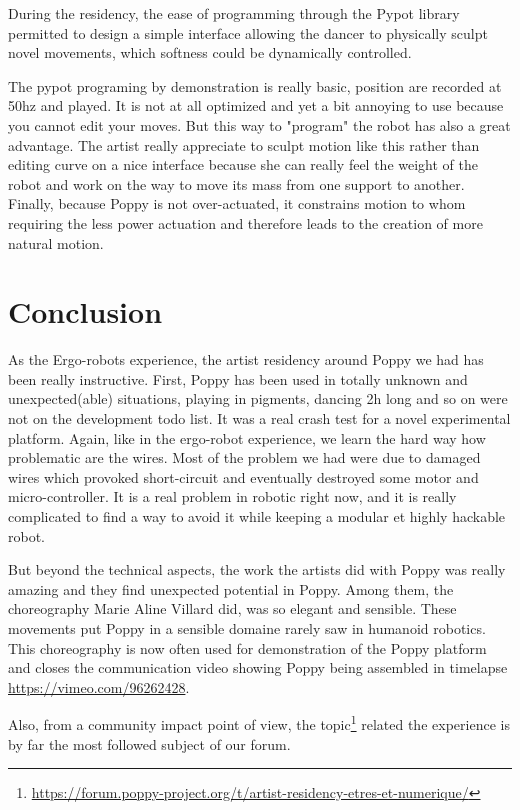 During the residency, the ease of programming through the Pypot library permitted to design a simple interface allowing the dancer to physically sculpt novel movements, which softness could be dynamically controlled.

The pypot programing by demonstration is really basic, position are recorded at 50hz and played. It is not at all optimized and yet a bit annoying to use because you cannot edit your moves. But this way to "program" the robot has also a great advantage. The artist really appreciate to sculpt motion like this rather than editing curve on a nice interface because she can really feel the weight of the robot and work on the way to move its mass from one support to another. Finally, because Poppy is not over-actuated, it constrains motion to whom requiring the less power actuation and therefore leads to the creation of more natural motion.


\section{Conclusion} %
As the Ergo-robots experience, the artist residency around Poppy we had has been really instructive. First, Poppy has been used in totally unknown and unexpected(able) situations, playing in pigments, dancing 2h long and so on were not on the development todo list. It was a real crash test for a novel experimental platform. Again, like in the ergo-robot experience, we learn the hard way how problematic are the wires. Most of the problem we had were due to damaged wires which provoked short-circuit and eventually destroyed some motor and micro-controller. It is a real problem in robotic right now, and it is really complicated to find a way to avoid it while keeping a modular et highly hackable robot.

But beyond the technical aspects, the work the artists did with Poppy was really amazing and they find unexpected potential in Poppy. Among them, the choreography Marie Aline Villard did, was so elegant and sensible. These movements put Poppy in a sensible domaine rarely saw in humanoid robotics. This choreography is now often used for demonstration of the Poppy platform and closes the communication video showing Poppy being assembled in timelapse \url{https://vimeo.com/96262428}.

Also, from a community impact point of view, the topic\footnote{\url{https://forum.poppy-project.org/t/artist-residency-etres-et-numerique/}} related the experience is by far the most followed subject of our forum.


